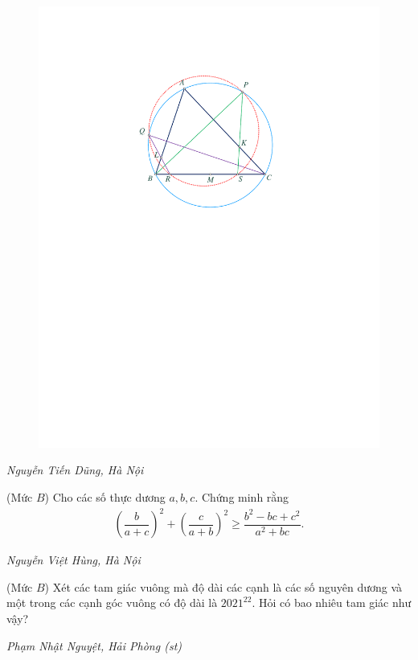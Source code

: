 \begin{multicols}{2}
\begin{figure}[H]
		\includegraphics[width= 0.95\linewidth]{P624}
		\vspace*{-15pt}
	\end{figure}
	\begin{flushright}
		\textit{Nguyễn Tiến Dũng, Hà Nội}
	\end{flushright}
	{}
	(Mức $B$) Cho các số thực dương $a,b,c$. Chứng minh rằng
	\begin{align*}
		\left(\dfrac b{a+c}\right)^2+\left(\dfrac{c}{a+b}\right)^2\ge \dfrac{b^2-bc+c^2}{a^2+bc}.
	\end{align*}
	\begin{flushright}
		\textit{Nguyễn Việt Hùng, Hà Nội}
	\end{flushright}
	{}
	(Mức $B$) Xét các tam giác vuông mà độ dài các cạnh là các số nguyên dương và một trong các cạnh góc vuông có độ dài là $2021^{22}$. Hỏi có bao nhiêu tam giác như vậy?
	\begin{flushright}
		\textit{Phạm Nhật Nguyệt, Hải Phòng (st)}
	\end{flushright}

\end{multicols}
